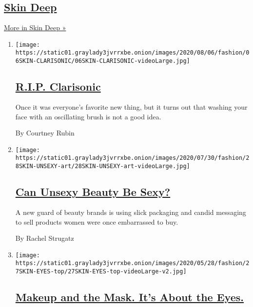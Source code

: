 \hypertarget{skin-deep}{%
\subsection{\texorpdfstring{\href{/column/skin-deep}{Skin
Deep}}{Skin Deep}}\label{skin-deep}}

\href{/column/skin-deep}{More in Skin Deep »}

\begin{enumerate}
\def\labelenumi{\arabic{enumi}.}
\item
  \texttt{[image: https://static01.graylady3jvrrxbe.onion/images/2020/08/06/fashion/06SKIN-CLARISONIC/06SKIN-CLARISONIC-videoLarge.jpg]}

  \hypertarget{rip-clarisonic}{%
  \subsection{\texorpdfstring{\href{/2020/08/05/style/skin-care-rip-clarisonic.html}{R.I.P.
  Clarisonic}}{R.I.P. Clarisonic}}\label{rip-clarisonic}}

  Once it was everyone's favorite new thing, but it turns out that
  washing your face with an oscillating brush is not a good idea.

  By Courtney Rubin
\item
  \texttt{[image: https://static01.graylady3jvrrxbe.onion/images/2020/07/30/fashion/28SKIN-UNSEXY-art/28SKIN-UNSEXY-art-videoLarge.jpg]}

  \hypertarget{can-unsexy-beauty-be-sexy}{%
  \subsection{\texorpdfstring{\href{/2020/07/28/style/can-unsexy-beauty-be-sexy.html}{Can
  Unsexy Beauty Be
  Sexy?}}{Can Unsexy Beauty Be Sexy?}}\label{can-unsexy-beauty-be-sexy}}

  A new guard of beauty brands is using slick packaging and candid
  messaging to sell products women were once embarrassed to buy.

  By Rachel Strugatz
\item
  \texttt{[image: https://static01.graylady3jvrrxbe.onion/images/2020/05/28/fashion/27SKIN-EYES-top/27SKIN-EYES-top-videoLarge-v2.jpg]}

  \hypertarget{makeup-and-the-mask-its-about-the-eyes}{%
  \subsection{\texorpdfstring{\href{/2020/05/26/style/makeup-and-the-mask-its-about-the-eyes.html}{Makeup
  and the Mask. It's About the
  Eyes.}}{Makeup and the Mask. It's About the Eyes.}}\label{makeup-and-the-mask-its-about-the-eyes}}


\end{enumerate}
